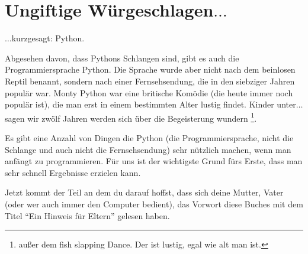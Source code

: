\section{Ungiftige Würgeschlagen$\ldots$}

$\ldots$kurzgesagt: Python.

Abgesehen davon, dass Pythons Schlangen sind, gibt es auch die Programmiersprache Python. Die Sprache wurde aber nicht nach dem beinlosen Reptil benannt, sondern nach einer Fernsehsendung, die in den siebziger Jahren populär war. Monty Python war eine britische Komödie (die heute immer noch populär ist), die man erst in einem bestimmten Alter lustig findet. Kinder unter$\ldots$ sagen wir zwölf Jahren werden sich über die Begeisterung wundern \footnote{außer dem fish slapping Dance. Der ist lustig, egal wie alt man ist.}.

Es gibt eine Anzahl von Dingen die Python (die Programmiersprache, nicht die Schlange und auch nicht die Fernsehsendung) sehr nützlich machen, wenn man anfängt zu programmieren. Für uns ist der wichtigste Grund fürs Erste, dass man sehr schnell Ergebnisse erzielen kann.

Jetzt kommt der Teil an dem du darauf hoffst, dass sich deine Mutter, Vater (oder wer auch immer den Computer bedient), das Vorwort diese Buches mit dem Titel ``Ein Hinweis für Eltern'' gelesen haben.

